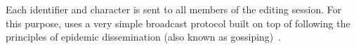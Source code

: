 
%   


Each identifier and character is sent to all members of the editing session. For
this purpose, \CRATE uses a very simple broadcast protocol built on top of
\SPRAY following the principles of epidemic dissemination (also known as
gossiping)~\cite{demers1987epidemic}.

